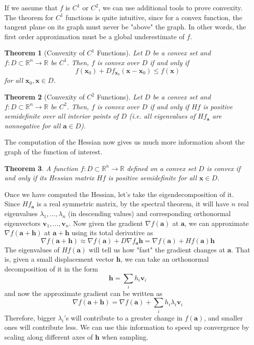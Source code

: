 \documentclass{article}
\newtheorem{theorem}{Theorem}[section]
\theoremstyle{remark}
\theoremstyle{definition}
\begin{document}
If we assume that $f$ is $C^1$ or $C^2$, we can use additional tools to prove convexity. The theorem for $C^1$ functions is quite intuitive, since for a convex function, the tangent plane on its graph must never be "above" the graph. In other words, the first order approximation must be a global underestimate of $f$. 

\begin{theorem}[Convexity of $C^1$ Functions]
Let $D$ be a convex set and $f: D \subset \mathbb{R}^n \longrightarrow \mathbb{R}$ be $C^1$. Then, $f$ is convex over $D$ if and only if 
\[f(\mathbf{x}_0) + D f_{\mathbf{x}_0} (\mathbf{x} - \mathbf{x}_0) \leq f(\mathbf{x})\]
for all $\mathbf{x}_0, \mathbf{x} \in D$. 
\end{theorem}

\begin{theorem}[Convexity of $C^2$ Functions]
Let $D$ be a convex set and $f: D \subset \mathbb{R}^n \longrightarrow \mathbb{R}$ be $C^2$. Then, $f$ is convex over $D$ if and only if $H f$ is positive semidefinite over all interior points of $D$ (i.e. all eigenvalues of $H f_\mathbf{a}$ are nonnegative for all $\mathbf{a} \in D$). 
\end{theorem}

The computation of the Hessian now gives us much more information about the graph of the function of interest. 

\begin{theorem}
A function $f: D \subset \mathbb{R}^n \longrightarrow \mathbb{R}$ defined on a convex set $D$ is convex if and only if its Hessian matrix $H f$ is positive semidefinite for all $\mathbf{x} \in D$. 
\end{theorem} 

Once we have computed the Hessian, let's take the eigendecomposition of it. Since $H f_\mathbf{a}$ is a real symmetric matrix, by the spectral theorem, it will have $n$ real eigenvalues $\lambda_1, \ldots, \lambda_n$ (in descending values) and corresponding orthonormal eigenvectors $\mathbf{v}_1, \ldots, \mathbf{v}_n$. Now given the gradient $\nabla f(\mathbf{a})$ at $\mathbf{a}$, we can approximate $\nabla f(\mathbf{a} + \mathbf{h})$ at $\mathbf{a} + \mathbf{h}$ using its total derivative as 
\[\nabla f(\mathbf{a} + \mathbf{h}) \approx \nabla f(\mathbf{a}) + D \nabla f_\mathbf{a} \mathbf{h} = \nabla f(\mathbf{a}) + H f(\mathbf{a}) \mathbf{h}\]
The eigenvalues of $H f(\mathbf{a})$ will tell us how "fast" the gradient changes at $\mathbf{a}$. That is, given a small displacement vector $\mathbf{h}$, we can take an orthonormal decomposition of it in the form 
\[\mathbf{h} = \sum_{i} h_i \mathbf{v}_i\]
and now the approximate gradient can be written as 
\[\nabla f (\mathbf{a} + \mathbf{h}) = \nabla f(\mathbf{a}) + \sum_i h_i \lambda_i \mathbf{v}_i\]
Therefore, bigger $\lambda_i$'s will contribute to a greater change in $f(\mathbf{a})$, and smaller ones will contribute less. We can use this information to speed up convergence by scaling along different axes of $\mathbf{h}$ when sampling. 
\end{document}
